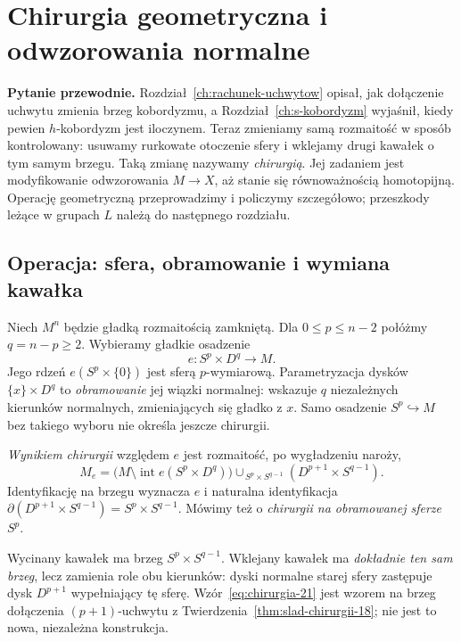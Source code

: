 \chapter{Chirurgia geometryczna i odwzorowania normalne}
\label{ch:chirurgia-geometryczna-21}

\noindent\textbf{Pytanie przewodnie.}
Rozdział~\ref{ch:rachunek-uchwytow} opisał, jak dołączenie uchwytu
zmienia brzeg kobordyzmu, a Rozdział~\ref{ch:s-kobordyzm}
wyjaśnił, kiedy pewien $h$-kobordyzm jest iloczynem.
Teraz zmieniamy samą rozmaitość w sposób kontrolowany:
usuwamy rurkowate otoczenie sfery i wklejamy drugi kawałek
o tym samym brzegu. Taką zmianę nazywamy \emph{chirurgią}.
Jej zadaniem jest modyfikowanie odwzorowania $M\to X$,
aż stanie się równoważnością homotopijną.
Operację geometryczną przeprowadzimy i policzymy szczegółowo;
przeszkody leżące w grupach $L$ należą do następnego rozdziału.

\section{Operacja: sfera, obramowanie i wymiana kawałka}
\label{sec:krok-chirurgii-21}

Niech $M^n$ będzie gładką rozmaitością zamkniętą.
Dla $0\leq p\leq n-2$ połóżmy $q=n-p\geq2$.
Wybieramy gładkie osadzenie
\[
 e:S^p\times D^q\longrightarrow M.
\]
Jego rdzeń $e(S^p\times\{0\})$ jest sferą $p$-wymiarową.
Parametryzacja dysków $\{x\}\times D^q$ to
\emph{obramowanie} jej wiązki normalnej: wskazuje $q$
niezależnych kierunków normalnych, zmieniających się
gładko z $x$. Samo osadzenie $S^p\hookrightarrow M$
bez takiego wyboru nie określa jeszcze chirurgii.

\begin{definicja}
\label{def:chirurgia-21}
\emph{Wynikiem chirurgii} względem $e$ jest
rozmaitość, po wygładzeniu naroży,
\begin{equation}\label{eq:chirurgia-21}
 M_e=\bigl(M\setminus\operatorname{int}e(S^p\times D^q)\bigr)
 \mathbin{\cup_{\,S^p\times S^{q-1}}}
 (D^{p+1}\times S^{q-1}).
\end{equation}
Identyfikację na brzegu wyznacza $e$ i naturalna
identyfikacja $\partial(D^{p+1}\times S^{q-1})
=S^p\times S^{q-1}$.
Mówimy też o \emph{chirurgii na obramowanej sferze $S^p$}.
\end{definicja}

Wycinany kawałek ma brzeg $S^p\times S^{q-1}$.
Wklejany kawałek ma \emph{dokładnie ten sam brzeg},
lecz zamienia role obu kierunków: dyski normalne starej
sfery zastępuje dysk $D^{p+1}$ wypełniający tę sferę.
Wzór~\eqref{eq:chirurgia-21} jest wzorem na
brzeg dołączenia $(p+1)$-uchwytu z
Twierdzenia~\ref{thm:slad-chirurgii-18}; nie
jest to nowa, niezależna konstrukcja.

